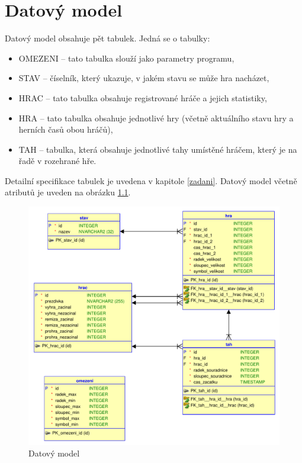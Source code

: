 \documentclass[
11pt,
a4paper,
pdftex,
czech,
titlepage
]{report}
\begin{document}
\chapter{Datový model}\label{data_model}
Datový model obsahuje pět tabulek. Jedná se o tabulky:
\begin{itemize}
    \item OMEZENI -- tato tabulka slouží jako parametry programu,
    \item STAV -- číselník, který ukazuje, v jakém stavu se může hra nacházet,
    \item HRAC -- tato tabulka obsahuje registrované hráče a jejich statistiky,
    \item HRA -- tato tabulka obsahuje jednotlivé hry (včetně aktuálního stavu hry a herních časů obou hráčů),
    \item TAH -- tabulka, která obsahuje jednotlivé tahy umístěné hráčem, který je na řadě v rozehrané hře.
\end{itemize}

Detailní specifikace tabulek je uvedena v kapitole \ref{zadani}. Datový model včetně atributů je uveden na obrázku \ref{data_model_obr}.

\begin{figure}[!ht]
	\centering
	\includegraphics[width=1\textwidth]{img/data_model.pdf}
	\caption{Datový model}
	\label{data_model_obr}
\end{figure}
\end{document}
